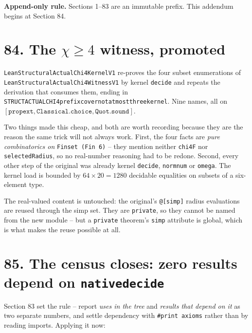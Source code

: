 \documentclass[9pt,twocolumn]{article}
\renewcommand{\_}{\CIGunderscore\allowbreak}
\begin{document}
\sloppy
\twocolumn[{\begin{center}
{\LARGE\bfseries Report 4 - Structural Rankability}\\[2pt]
{\large\itshape Append-only update G: the chi>=4 witness becomes PROVED, and the census closes at zero}\\[2pt]
{\small CIG-AMF Scientific Evolution Report -- 11 September}
\end{center}\vspace{2mm}}]

\textbf{Append-only rule.} Sections 1--83 are an immutable prefix. This addendum begins at Section 84.

\section*{84. The $\chi \ge 4$ witness, promoted}
\texttt{LeanStructuralActualChi4KernelV1} re-proves the four subset enumerations of \texttt{LeanStructuralActualChi4WitnessV1} by kernel \texttt{decide} and repeats the derivation that consumes them, ending in \texttt{STRUCT\_ACTUAL\_CHI4\_prefix\_cover\_not\_at\_most\_three\_kernel}. Nine names, all on $[\texttt{propext}, \texttt{Classical.choice}, \texttt{Quot.sound}]$.

Two things made this cheap, and both are worth recording because they are the reason the same trick will not always work. First, the four facts are \emph{pure combinatorics on} \texttt{Finset (Fin 6)} -- they mention neither \texttt{chi4F} nor \texttt{selectedRadius}, so no real-number reasoning had to be redone. Second, every other step of the original was already kernel \texttt{decide}, \texttt{norm\_num} or \texttt{omega}. The kernel load is bounded by $64 \times 20 = 1280$ decidable equalities on subsets of a six-element type.

The real-valued content is untouched: the original's \texttt{@[simp]} radius evaluations are reused through the simp set. They are \texttt{private}, so they cannot be named from the new module -- but a \texttt{private} theorem's \texttt{simp} attribute is global, which is what makes the reuse possible at all.

\section*{85. The census closes: zero results depend on \texttt{native\_decide}}
Section 83 set the rule -- report \emph{uses in the tree} and \emph{results that depend on it} as two separate numbers, and settle dependency with \texttt{\#print axioms} rather than by reading imports. Applying it now:
\end{document}
